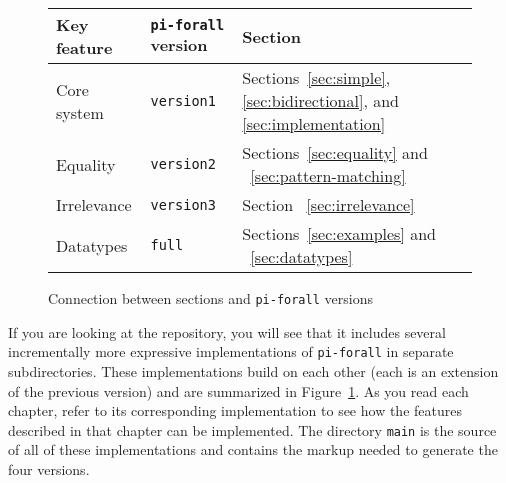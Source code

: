 \documentclass{article}
\newcommand\pif{\texttt{pi-forall}\xspace}
\theoremstyle{definition}
\begin{document}
\begin{figure}[ht]
\begin{center}
\begin{tabular}{llll}
Key feature & \pif version      & Section\\
\hline
Core system & \texttt{version1} & Sections~\ref{sec:simple}, \ref{sec:bidirectional}, and \ref{sec:implementation} \\
Equality    & \texttt{version2} & Sections~\ref{sec:equality} and ~\ref{sec:pattern-matching}\\
Irrelevance & \texttt{version3} & Section ~\ref{sec:irrelevance} \\
Datatypes   & \texttt{full}     & Sections~\ref{sec:examples} and ~\ref{sec:datatypes} \\
\end{tabular}
\end{center}
\caption{Connection between sections and \pif versions}
\label{fig:impls}
\end{figure}

If you are looking at the repository, you will see that it includes several
incrementally more expressive implementations of \pif in separate
subdirectories. These implementations build on each other (each is an
extension of the previous version) and are summarized in
Figure~\ref{fig:impls}.  As you read each chapter, refer to its corresponding
implementation to see how the features described in that chapter can be
implemented. The directory \texttt{main} is the source of all of these
implementations and contains the markup needed to generate the four versions.
\end{document}
